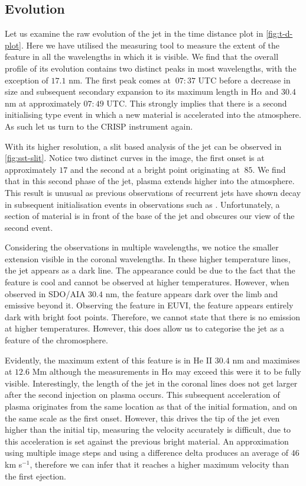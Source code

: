 \subsection{Evolution}
Let us examine the raw evolution of the jet in the time distance plot in \cref{fig:t-d-plot}.
Here we have utilised the measuring tool to measure the extent of the feature in all the wavelengths in which it is visible.
We find that the overall profile of its evolution contains two distinct peaks in most wavelengths, with the exception of $17.1$ nm.
The first peak comes at $~07:37$ UTC before a decrease in size and subsequent secondary expansion to its maximum length in H$\alpha$ and $30.4$ nm at approximately $07:49$ UTC.
This strongly implies that there is a second initialising type event in which a new material is accelerated into the atmosphere.
As such let us turn to the CRISP instrument again.

With its higher resolution, a slit based analysis of the jet can be observed in \cref{fig:sst-slit}.
Notice two distinct curves in the image, the first onset is at approximately $17$ and the second at a bright point originating at $~85$.
We find that in this second phase of the jet, plasma extends higher into the atmosphere.
This result is unusual as previous observations of recurrent jets have shown decay in subsequent initialisation events in observations such as \cite{Jiang2007}.
Unfortunately, a section of material is in front of the base of the jet and obscures our view of the second event.

Considering the observations in multiple wavelengths, we notice the smaller extension visible in the coronal wavelengths.
In these higher temperature lines, the jet appears as a dark line.
The appearance could be due to the fact that the feature is cool and cannot be observed at higher temperatures.
However, when observed in SDO/AIA $30.4$ nm, the feature appears dark over the limb and emissive beyond it.
Observing the feature in EUVI, the feature appears entirely dark with bright foot points.
Therefore, we cannot state that there is no emission at higher temperatures. 
However, this does allow us to categorise the jet as a feature of the chromosphere.


Evidently, the maximum extent of this feature is in He II $30.4$ nm and maximises at $12.6$ Mm although the measurements in H$\alpha$ may exceed this were it to be fully visible.
Interestingly, the length of the jet in the coronal lines does not get larger after the second injection on plasma occurs.
This subsequent acceleration of plasma originates from the same location as that of the initial formation, and on the same scale as the first onset.
However, this drives the tip of the jet even higher than the initial tip, measuring the velocity accurately is difficult, due to this acceleration is set against the previous bright material.
An approximation using multiple image steps and using a difference delta produces an average of $46$ km s${^{-1}}$, therefore we can infer that it reaches a higher maximum velocity than the first ejection.


